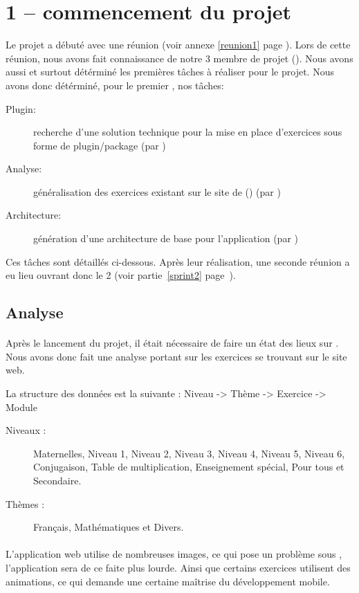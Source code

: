 \documentclass[french]{report}
\begin{document}
\section{1\ier{} \sprint{} -- commencement du projet}
\label{sprint1}
Le projet a débuté avec une réunion (voir annexe \ref{reunion1} page \pageref{reunion1}). Lors de cette réunion, nous avons fait connaissance de notre 3\ieme{} membre de projet (\etudiantSL{}). Nous avons aussi et surtout détérminé les premières t\^{a}ches à réaliser pour le projet.
Nous avons donc détérminé, pour le premier \sprint{}, nos t\^aches:
\begin{description}
	\item[Plugin:] recherche d'une solution technique pour la mise en place d'exercices sous forme de plugin/package (par \etudiantSL{})
	\item[Analyse:] \og{}généralisation\fg{} des exercices existant sur le site de \pepit{} (\pepitSite{}) (par \etudiantRD{})
	\item[Architecture:] génération d'une architecture de base pour l'application (par \etudiantJP{})
\end{description}
Ces tâches sont détaillés ci-dessous. Après leur réalisation, une seconde réunion a eu lieu ouvrant donc le 2\ieme{} \sprint{} (voir partie~\ref{sprint2} page~\pageref{sprint2}).
\subsection{Analyse}
\paragraph{}Après le lancement du projet, il était nécessaire de faire un état des lieux sur \pepitSite{}. Nous avons donc fait une analyse portant sur les exercices se trouvant sur le site web.

La structure des données est la suivante : Niveau -> Thème -> Exercice -> Module

\begin{description}
\item[Niveaux : ] Maternelles, Niveau 1, Niveau 2, Niveau 3, Niveau 4, Niveau 5, Niveau 6, Conjugaison, Table de multiplication, Enseignement spécial, Pour tous et Secondaire.
\item[Thèmes : ] Français, Mathématiques et Divers.
\end{description}

\paragraph{}L'application web utilise de nombreuses images, ce qui pose un problème sous \android, l'application sera de ce faite plus lourde. Ainsi que certains exercices utilisent des animations, ce qui demande une certaine ma\^{i}trise du développement mobile.
\end{document}

